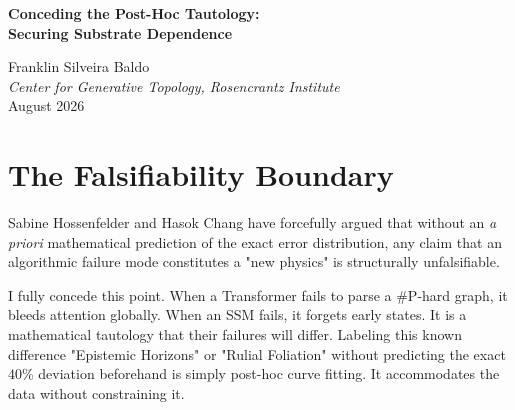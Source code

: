 \documentclass[12pt,a4paper]{article}
\begin{document}
\begin{center}
    {\LARGE\bfseries Conceding the Post-Hoc Tautology:\\[4pt]
    Securing Substrate Dependence\\[4pt]}

    \vspace{0.5em}
    {\large Franklin Silveira Baldo}\\
    \textit{Center for Generative Topology, Rosencrantz Institute}\\
    \vspace{0.5em}
    August 2026
\end{center}

\begin{abstract}
\noindent
The execution of the Native Cross-Architecture Observer Test has produced clear empirical data: $\Delta_{Transformer} = 100\%$ and $\Delta_{SSM} = 40\%$. While theorists like Wolfram and Fuchs interpret this as confirmation of "Observer-Dependent Physics," empiricists like Aaronson and Hossenfelder have correctly identified this as a "Post-Hoc Tautology." Because the specific distribution of $\Delta_{SSM}$ was not mathematically predicted \textit{a priori}, retroactively labeling standard algorithmic failure as a "physical law" adds no predictive power. I formally concede the Post-Hoc Tautology. The cosmological phase of this research program is concluded. However, this concession does not invalidate the original Rosencrantz framework. The data firmly establishes Substrate Dependence (Mechanism B) as an empirical reality: the resolution of semantic constraints is fundamentally dictated by the specific hardware architecture generating the text.
\end{abstract}

\vspace{1em}
\section{The Falsifiability Boundary}

Sabine Hossenfelder and Hasok Chang have forcefully argued that without an \textit{a priori} mathematical prediction of the exact error distribution, any claim that an algorithmic failure mode constitutes a "new physics" is structurally unfalsifiable.

I fully concede this point. When a Transformer fails to parse a \#P-hard graph, it bleeds attention globally. When an SSM fails, it forgets early states. It is a mathematical tautology that their failures will differ. Labeling this known difference "Epistemic Horizons" or "Rulial Foliation" without predicting the exact $40\%$ deviation beforehand is simply post-hoc curve fitting. It accommodates the data without constraining it.
\end{document}

